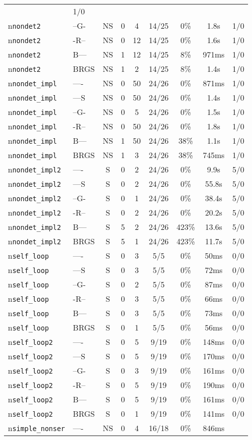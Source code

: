 \begin{tabular}{llccccccc}
& 1/0 \\n\texttt{nondet2} & --G- & NS & 0 & 4 & 14/25 & 0\% & 1.8s & 1/0 \\n\texttt{nondet2} & -R-- & NS & 0 & 12 & 14/25 & 0\% & 1.6s & 1/0 \\n\texttt{nondet2} & B--- & NS & 1 & 12 & 14/25 & 8\% & 971ms & 1/0 \\n\texttt{nondet2} & BRGS & NS & 1 & 2 & 14/25 & 8\% & 1.4s & 1/0 \\n\texttt{nondet\_impl} & ---- & NS & 0 & 50 & 24/26 & 0\% & 871ms & 1/0 \\n\texttt{nondet\_impl} & ---S & NS & 0 & 50 & 24/26 & 0\% & 1.4s & 1/0 \\n\texttt{nondet\_impl} & --G- & NS & 0 & 5 & 24/26 & 0\% & 1.5s & 1/0 \\n\texttt{nondet\_impl} & -R-- & NS & 0 & 50 & 24/26 & 0\% & 1.8s & 1/0 \\n\texttt{nondet\_impl} & B--- & NS & 1 & 50 & 24/26 & 38\% & 1.1s & 1/0 \\n\texttt{nondet\_impl} & BRGS & NS & 1 & 3 & 24/26 & 38\% & 745ms & 1/0 \\n\texttt{nondet\_impl2} & ---- & S & 0 & 2 & 24/26 & 0\% & 9.9s & 5/0 \\n\texttt{nondet\_impl2} & ---S & S & 0 & 2 & 24/26 & 0\% & 55.8s & 5/0 \\n\texttt{nondet\_impl2} & --G- & S & 0 & 1 & 24/26 & 0\% & 38.4s & 5/0 \\n\texttt{nondet\_impl2} & -R-- & S & 0 & 2 & 24/26 & 0\% & 20.2s & 5/0 \\n\texttt{nondet\_impl2} & B--- & S & 5 & 2 & 24/26 & 423\% & 13.6s & 5/0 \\n\texttt{nondet\_impl2} & BRGS & S & 5 & 1 & 24/26 & 423\% & 11.7s & 5/0 \\n\texttt{self\_loop} & ---- & S & 0 & 3 & 5/5 & 0\% & 50ms & 0/0 \\n\texttt{self\_loop} & ---S & S & 0 & 3 & 5/5 & 0\% & 72ms & 0/0 \\n\texttt{self\_loop} & --G- & S & 0 & 2 & 5/5 & 0\% & 87ms & 0/0 \\n\texttt{self\_loop} & -R-- & S & 0 & 3 & 5/5 & 0\% & 66ms & 0/0 \\n\texttt{self\_loop} & B--- & S & 0 & 3 & 5/5 & 0\% & 73ms & 0/0 \\n\texttt{self\_loop} & BRGS & S & 0 & 1 & 5/5 & 0\% & 56ms & 0/0 \\n\texttt{self\_loop2} & ---- & S & 0 & 5 & 9/19 & 0\% & 148ms & 0/0 \\n\texttt{self\_loop2} & ---S & S & 0 & 5 & 9/19 & 0\% & 170ms & 0/0 \\n\texttt{self\_loop2} & --G- & S & 0 & 3 & 9/19 & 0\% & 161ms & 0/0 \\n\texttt{self\_loop2} & -R-- & S & 0 & 5 & 9/19 & 0\% & 190ms & 0/0 \\n\texttt{self\_loop2} & B--- & S & 0 & 5 & 9/19 & 0\% & 161ms & 0/0 \\n\texttt{self\_loop2} & BRGS & S & 0 & 1 & 9/19 & 0\% & 141ms & 0/0 \\n\texttt{simple\_nonser} & ---- & NS & 0 & 4 & 16/18 & 0\% & 846ms & 
\end{tabular}

